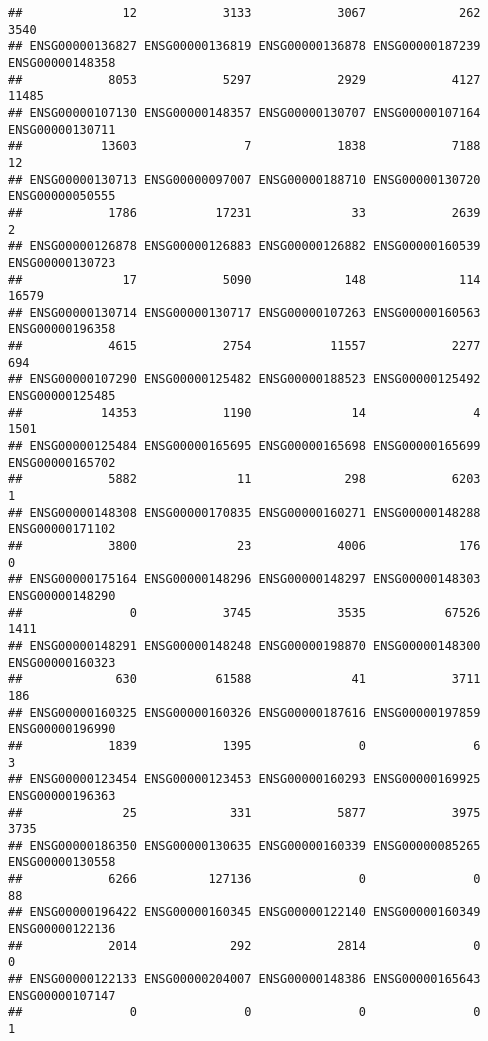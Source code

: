 \documentclass[
]{article}
\begin{document}
\begin{verbatim}
##              12            3133            3067             262            3540 
## ENSG00000136827 ENSG00000136819 ENSG00000136878 ENSG00000187239 ENSG00000148358 
##            8053            5297            2929            4127           11485 
## ENSG00000107130 ENSG00000148357 ENSG00000130707 ENSG00000107164 ENSG00000130711 
##           13603               7            1838            7188              12 
## ENSG00000130713 ENSG00000097007 ENSG00000188710 ENSG00000130720 ENSG00000050555 
##            1786           17231              33            2639               2 
## ENSG00000126878 ENSG00000126883 ENSG00000126882 ENSG00000160539 ENSG00000130723 
##              17            5090             148             114           16579 
## ENSG00000130714 ENSG00000130717 ENSG00000107263 ENSG00000160563 ENSG00000196358 
##            4615            2754           11557            2277             694 
## ENSG00000107290 ENSG00000125482 ENSG00000188523 ENSG00000125492 ENSG00000125485 
##           14353            1190              14               4            1501 
## ENSG00000125484 ENSG00000165695 ENSG00000165698 ENSG00000165699 ENSG00000165702 
##            5882              11             298            6203               1 
## ENSG00000148308 ENSG00000170835 ENSG00000160271 ENSG00000148288 ENSG00000171102 
##            3800              23            4006             176               0 
## ENSG00000175164 ENSG00000148296 ENSG00000148297 ENSG00000148303 ENSG00000148290 
##               0            3745            3535           67526            1411 
## ENSG00000148291 ENSG00000148248 ENSG00000198870 ENSG00000148300 ENSG00000160323 
##             630           61588              41            3711             186 
## ENSG00000160325 ENSG00000160326 ENSG00000187616 ENSG00000197859 ENSG00000196990 
##            1839            1395               0               6               3 
## ENSG00000123454 ENSG00000123453 ENSG00000160293 ENSG00000169925 ENSG00000196363 
##              25             331            5877            3975            3735 
## ENSG00000186350 ENSG00000130635 ENSG00000160339 ENSG00000085265 ENSG00000130558 
##            6266          127136               0               0              88 
## ENSG00000196422 ENSG00000160345 ENSG00000122140 ENSG00000160349 ENSG00000122136 
##            2014             292            2814               0               0 
## ENSG00000122133 ENSG00000204007 ENSG00000148386 ENSG00000165643 ENSG00000107147 
##               0               0               0               0               1 

\end{verbatim}
\end{document}
